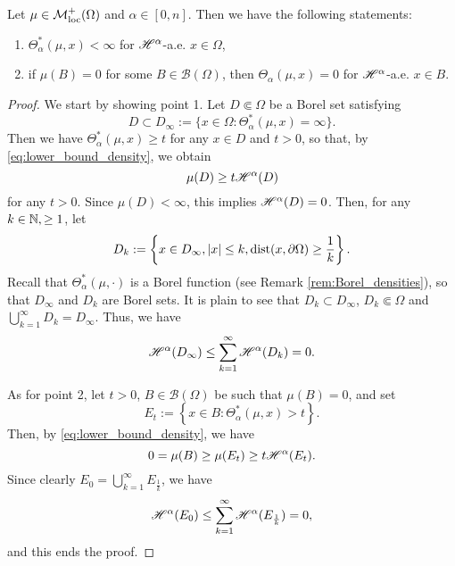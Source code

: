 \begin{corollary} \label{cor:Hausdorff_density_estimate}
Let $\mu \in \mathcal{M}^{+}_{\rm loc}(\Omega)$ and $\alpha \in [0, n]$. Then we have the following statements:
\begin{enumerate}
\item $\Theta^{*}_{\alpha}(\mu, x) < \infty$ for $\mathscr{H}^{\alpha}$-a.e. $x \in \Omega$,
\item if $\mu(B) = 0$ for some $B \in \mathcal{B}(\Omega)$, then $\Theta_{\alpha}(\mu, x) = 0$ for $\mathscr{H}^{\alpha}$-a.e. $x \in B$.
\end{enumerate}
\end{corollary}
\begin{proof}
We start by showing point 1. Let $D \Subset \Omega$ be a Borel set satisfying
\begin{equation*} 
D \subset D_{\infty} := \{ x \in \Omega : \Theta^{*}_{\alpha}(\mu, x) = \infty \}.
\end{equation*}
Then we have $\Theta^{*}_{\alpha}(\mu, x) \ge t$ for any $x \in D$ and $t > 0$, so that, by \eqref{eq:lower_bound_density}, we obtain $$\mu(D) \ge t \mathscr{H}^{\alpha}(D)$$ for any $t > 0$. Since $\mu(D) < \infty$, this implies $\mathscr{H}^{\alpha}(D) = 0$.
Then, for any $k \in \mathbb{N}, \ge 1$, let 
\begin{equation*}
D_{k} := \left \{ x \in D_{\infty}, |x| \le k, \operatorname{dist}(x, \partial \Omega) \ge \frac{1}{k} \right \}.
\end{equation*}
Recall that $\Theta^{*}_{\alpha}(\mu, \cdot)$ is a Borel function (see Remark \ref{rem:Borel_densities}), so that $D_{\infty}$ and $D_{k}$ are Borel sets.
It is plain to see that $D_{k} \subset D_{\infty}$, $D_{k} \Subset \Omega$ and $\bigcup_{k = 1}^{\infty} D_{k} = D_{\infty}$.
Thus, we have
\begin{equation*}
\mathscr{H}^{\alpha}( D_{\infty}) \le \sum_{k = 1}^{\infty} \mathscr{H}^{\alpha}(D_{k}) = 0.
\end{equation*}
\smallskip

As for point 2, let $t > 0$, $B \in \mathcal{B}(\Omega)$ be such that $\mu(B) = 0$, and set
\begin{equation*}
E_{t} := \left \{ x \in B : \Theta^{*}_{\alpha}(\mu, x) > t \right \}.
\end{equation*}
Then, by \eqref{eq:lower_bound_density}, we have
\begin{equation*}
0 = \mu(B) \ge \mu(E_{t}) \ge t \mathscr{H}^{\alpha}(E_{t}).
\end{equation*}
Since clearly $E_{0} = \bigcup_{k =1}^{\infty} E_{\frac{1}{k}}$, we have 
\begin{equation*}
\mathscr{H}^{\alpha}(E_{0}) \le \sum_{k = 1}^{\infty} \mathscr{H}^{\alpha}(E_{\frac{1}{k}}) = 0,
\end{equation*}
and this ends the proof.
\end{proof}

